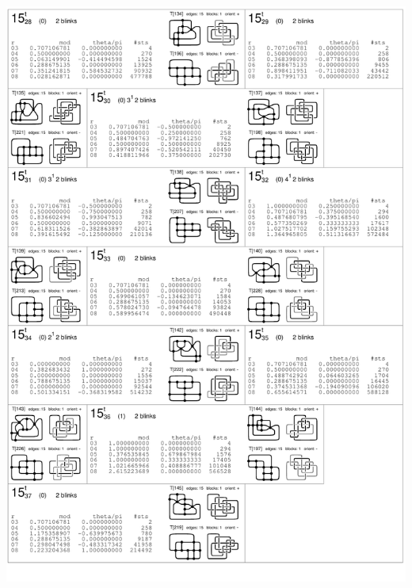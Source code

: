 \begin{center}
 \includegraphics[height=23.5cm]{E.figsbw2/con3catalog010_bw.pdf} \eject

\end{center}
